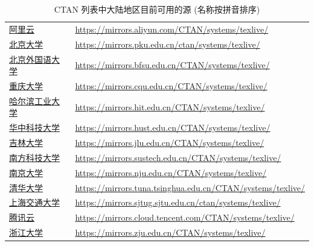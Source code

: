 \begin{table}
  \centering
  \caption{CTAN 列表中大陆地区目前可用的源 (名称按拼音排序)}\label{tab:appendix:mirror}
  \begin{tabular}{p{8\ccwd}p{58\ttwd}}
    \hline\hline
    \href{https://developer.aliyun.com/mirror/}{阿里云}
    & \url{https://mirrors.aliyun.com/CTAN/systems/texlive/}\\
    \href{https://mirrors.pku.edu.cn/}{北京大学}
    & \url{https://mirrors.pku.edu.cn/ctan/systems/texlive/}\\
    \href{https://mirrors.bfsu.edu.cn/}{北京外国语大学}
    & \url{https://mirrors.bfsu.edu.cn/CTAN/systems/texlive/}\\
    \href{https://mirrors.cqu.edu.cn/}{重庆大学}
    & \url{https://mirrors.cqu.edu.cn/CTAN/systems/texlive/}\\
    \href{https://mirrors.hit.edu.cn/}{哈尔滨工业大学}
    & \url{https://mirrors.hit.edu.cn/CTAN/systems/texlive/}\\
    \href{https://mirrors.hust.edu.cn/}{华中科技大学}
    & \url{https://mirrors.hust.edu.cn/CTAN/systems/texlive/}\\
    \href{https://mirrors.jlu.edu.cn/}{吉林大学}
    & \url{https://mirrors.jlu.edu.cn/CTAN/systems/texlive/}\\
    \href{https://mirrors.sustech.edu.cn/}{南方科技大学}
    & \url{https://mirrors.sustech.edu.cn/CTAN/systems/texlive/}\\
    \href{https://mirrors.nju.edu.cn/}{南京大学}
    & \url{https://mirrors.nju.edu.cn/CTAN/systems/texlive/}\\
    \href{https://mirrors.tuna.tsinghua.edu.cn/}{清华大学}
    & \url{https://mirrors.tuna.tsinghua.edu.cn/CTAN/systems/texlive/}\\
    \href{https://mirrors.sjtug.sjtu.edu.cn/}{上海交通大学}
    & \url{https://mirrors.sjtug.sjtu.edu.cn/ctan/systems/texlive/}\\
    \href{https://mirrors.cloud.tencent.com/}{腾讯云}
    & \url{https://mirrors.cloud.tencent.com/CTAN/systems/texlive/}\\
    \href{https://mirrors.zju.edu.cn/}{浙江大学}
    & \url{https://mirrors.zju.edu.cn/CTAN/systems/texlive/}\\
    \hline\hline
  \end{tabular}
\end{table}

